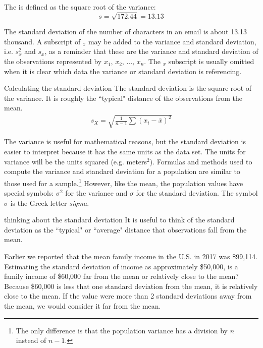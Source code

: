 The  is defined as the square root of the variance:
$$s=\sqrt{172.44} = 13.13$$

The standard deviation of the number of characters in an email is about 13.13 thousand. A subscript of $_x$ may be added to the variance and standard deviation, i.e. $s_x^2$ and $s_x^{}$, as a reminder that these are the variance and standard deviation of the observations represented by $x_1^{}$, $x_2^{}$, ..., $x_n^{}$. The $_{x}$ subscript is usually omitted when it is clear which data the variance or standard deviation is referencing.


\D{\newpage}

\begin{onebox}{Calculating the standard deviation}
The standard deviation is the square root of the variance. It is roughly the ``typical" distance of the observations from the mean.
\begin{eqnarray*}
\label{sdEquation}
s_{\scriptscriptstyle{X}}
 = \sqrt{\frac{1}{n-1} \sum{(x_i -  \bar{x})^2}}
\end{eqnarray*}
\end{onebox}

The variance is useful for mathematical reasons, but the standard deviation is easier to interpret because it has the same units as the data set. The units for variance will be the units squared (e.g. meters$^2$).
Formulas and methods used to compute the variance and standard deviation for a population are similar to those used for a sample.\footnote{The only difference is that the population variance has a division by $n$ instead of $n-1$.} However, like the mean, the population values have special symbols: $\sigma_{}^2$ for the variance and $\sigma$ for the standard deviation. The symbol $\sigma$  is the Greek letter \emph{sigma}.

\begin{onebox}{thinking about the standard deviation}
It is useful to think of the standard deviation as the ``typical" or ``average" distance that observations fall from the mean.\end{onebox}



\begin{examplewrap}
\begin{nexample}{Earlier we reported that the mean family income in the U.S. in 2017 was \$99,114. Estimating the standard deviation of income as approximately \$50,000, is a family income of \$60,000 far from the mean or relatively close to the mean?}
Because \$60,000 is less that one standard deviation from the mean, it is relatively close to the mean. If the value were more than 2 standard deviations away from the mean, we would consider it far from the mean.
\end{nexample}
\end{examplewrap}



